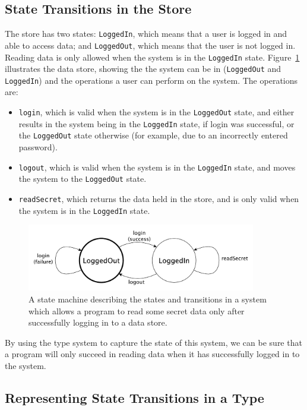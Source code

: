 \subsection{State Transitions in the Store}

The store has two states:
\texttt{LoggedIn}, which means that a user is logged in and able to access
data; and \texttt{LoggedOut}, which means that the user is not logged in.
Reading data is only allowed when the system is in the \texttt{LoggedIn} state.
%
Figure~\ref{fig:login} illustrates the data store, showing the
 the system can be in (\texttt{LoggedOut} and \texttt{LoggedIn})
and the operations a user can perform on the system. The operations are:

\begin{itemize}
\item \texttt{login}, which is valid when the system is in the 
\texttt{LoggedOut} state, and either results in the system being in the
\texttt{LoggedIn} state, if login was successful, or the \texttt{LoggedOut}
state otherwise (for example, due to an incorrectly entered password).
\item \texttt{logout}, which is valid when the system is in the
\texttt{LoggedIn} state, and moves the system to the \texttt{LoggedOut} state.
\item \texttt{readSecret}, which returns the data held in the store, and
is only valid when the system is in the \texttt{LoggedIn} state.
\end{itemize}

\begin{figure}[h]
\includegraphics[width=10cm]{diagrams/login.pdf}
\caption{A state machine describing the states and transitions in a system
which allows a program to read some secret data only after successfully logging
in to a data store.}
\label{fig:login}
\end{figure}

By using the type system to capture the state of this system, we can be
sure that a program will only succeed in reading data when it has successfully
logged in to the system. 

\subsection{Representing State Transitions in a Type}

